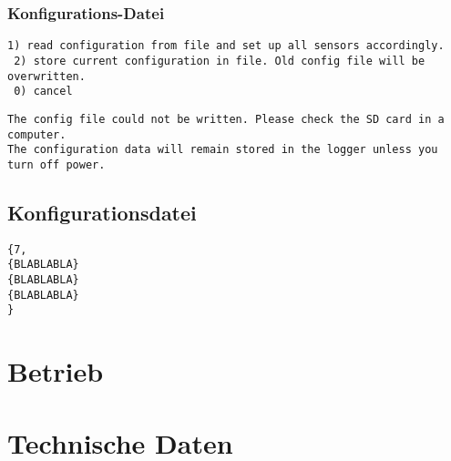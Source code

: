 \subsubsection{Konfigurations-Datei}
\begin{lstlisting}[caption=Untermenü Konfigurationsdatei, label=list.config]
 1) read configuration from file and set up all sensors accordingly.
 2) store current configuration in file. Old config file will be overwritten.
 0) cancel
\end{lstlisting}

\begin{lstlisting}[caption=Fehlermeldung beim Speichern der Konfigurationsdatei, label=list.configerror]
The config file could not be written. Please check the SD card in a computer.
The configuration data will remain stored in the logger unless you turn off power.
\end{lstlisting}

\subsection{Konfigurationsdatei}
\begin{lstlisting}[caption=Beispiel einer Konfigurationsdatei, label=list.configfile]
{7,
{BLABLABLA}
{BLABLABLA}
{BLABLABLA}
}
\end{lstlisting}

\section{Betrieb}


\section{Technische Daten}